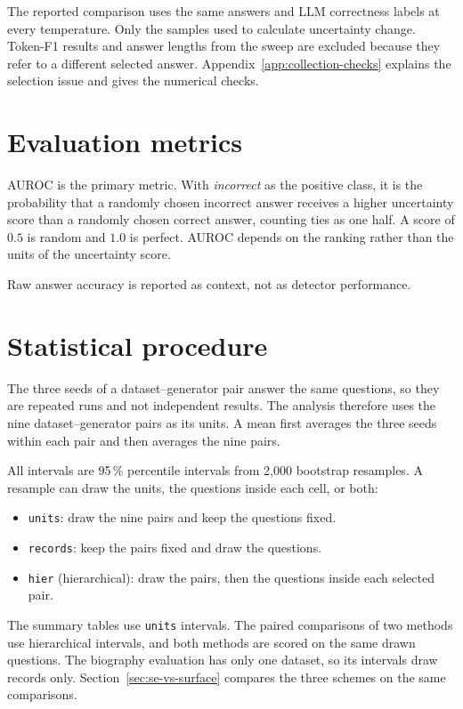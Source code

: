 The reported comparison uses the same answers and LLM correctness labels at
every temperature. Only the samples used to calculate uncertainty change.
Token-F1 results and answer lengths from the sweep are excluded because they
refer to a different selected answer. Appendix~\ref{app:collection-checks}
explains the selection issue and gives the numerical checks.

\section{Evaluation metrics}
\label{sec:evaluation-metrics}

AUROC is the primary metric. With \emph{incorrect} as the positive class, it is
the probability that a randomly chosen incorrect answer receives a higher
uncertainty score than a randomly chosen correct answer, counting ties as
one half. A score of $0.5$ is random and $1.0$ is perfect. AUROC depends on
the ranking rather than the units of the uncertainty score.

Raw answer accuracy is reported as context, not as detector performance.

\section{Statistical procedure}
\label{sec:statistics}

The three seeds of a dataset--generator pair answer the same questions, so they
are repeated runs and not independent results. The analysis therefore uses the
nine dataset--generator pairs as its units. A mean first averages the three
seeds within each pair and then averages the nine pairs.

All intervals are 95\,\% percentile intervals from 2{,}000 bootstrap resamples.
A resample can draw the units, the questions inside each cell, or both:

\begin{itemize}
  \item \texttt{units}: draw the nine pairs and keep the questions fixed.
  \item \texttt{records}: keep the pairs fixed and draw the questions.
  \item \texttt{hier} (hierarchical): draw the pairs, then the questions inside
    each selected pair.
\end{itemize}

The summary tables use \texttt{units} intervals. The paired comparisons of two
methods use hierarchical intervals, and both methods are scored on the same
drawn questions. The biography evaluation has only one dataset, so its
intervals draw records only. Section~\ref{sec:se-vs-surface} compares the three
schemes on the same comparisons.

